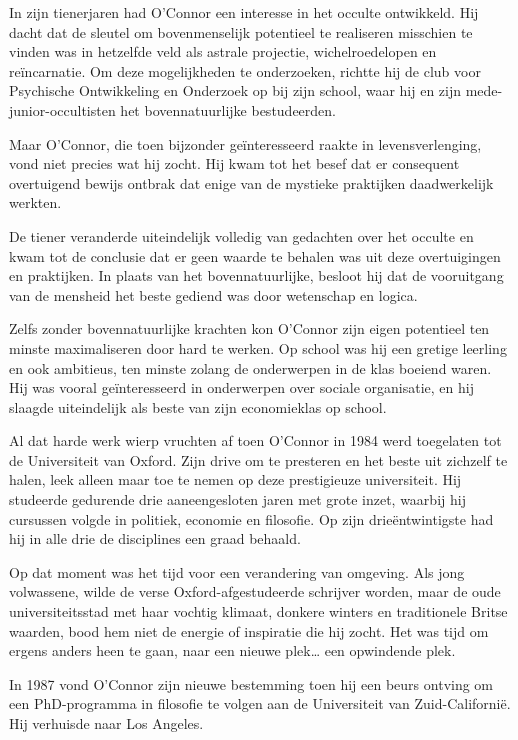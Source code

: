 \documentclass[
  a5paper,
  smalldemyvopaper,11pt,twoside,onecolumn,openright,extrafontsizes,
hidelinks]{memoir}
\begin{document}
In zijn tienerjaren had O'Connor een interesse in het occulte
ontwikkeld. Hij dacht dat de sleutel om bovenmenselijk potentieel te
realiseren misschien te vinden was in hetzelfde veld als astrale
projectie, wichelroedelopen en reïncarnatie. Om deze mogelijkheden te
onderzoeken, richtte hij de club voor Psychische Ontwikkeling en
Onderzoek op bij zijn school, waar hij en zijn mede-junior-occultisten
het bovennatuurlijke bestudeerden.

Maar O'Connor, die toen bijzonder geïnteresseerd raakte in
levensverlenging, vond niet precies wat hij zocht. Hij kwam tot het
besef dat er consequent overtuigend bewijs ontbrak dat enige van de
mystieke praktijken daadwerkelijk werkten.

De tiener veranderde uiteindelijk volledig van gedachten over het
occulte en kwam tot de conclusie dat er geen waarde te behalen was uit
deze overtuigingen en praktijken. In plaats van het bovennatuurlijke,
besloot hij dat de vooruitgang van de mensheid het beste gediend was
door wetenschap en logica.

Zelfs zonder bovennatuurlijke krachten kon O'Connor zijn eigen
potentieel ten minste maximaliseren door hard te werken. Op school was
hij een gretige leerling en ook ambitieus, ten minste zolang de
onderwerpen in de klas boeiend waren. Hij was vooral geïnteresseerd in
onderwerpen over sociale organisatie, en hij slaagde uiteindelijk als
beste van zijn economieklas op school.

Al dat harde werk wierp vruchten af toen O'Connor in 1984 werd
toegelaten tot de Universiteit van Oxford. Zijn drive om te presteren en
het beste uit zichzelf te halen, leek alleen maar toe te nemen op deze
prestigieuze universiteit. Hij studeerde gedurende drie aaneengesloten
jaren met grote inzet, waarbij hij cursussen volgde in politiek,
economie en filosofie. Op zijn drieëntwintigste had hij in alle drie de
disciplines een graad behaald.

Op dat moment was het tijd voor een verandering van omgeving. Als jong
volwassene, wilde de verse Oxford-afgestudeerde schrijver worden, maar
de oude universiteitsstad met haar vochtig klimaat, donkere winters en
traditionele Britse waarden, bood hem niet de energie of inspiratie die
hij zocht. Het was tijd om ergens anders heen te gaan, naar een nieuwe
plek\ldots{} een opwindende plek.

In 1987 vond O'Connor zijn nieuwe bestemming toen hij een beurs ontving
om een PhD-programma in filosofie te volgen aan de Universiteit van
Zuid-Californië. Hij verhuisde naar Los Angeles.
\end{document}
